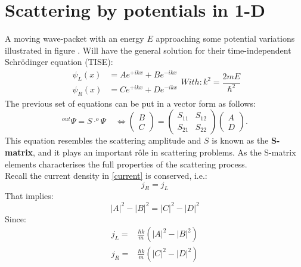 \section{Scattering by potentials in 1-D}
A moving wave-packet with an energy $E$ approaching some potential variations illustrated in figure . Will have the general solution for their time-independent Schr\"{o}dinger equation  (TISE):
\begin{subequations}
	\begin{align}
	\psi_L (x)&=Ae^{+ikx}+Be^{-ikx} \\
	\psi_R (x)&=Ce^{+ikx}+De^{-ikx} 
	\end{align}
	With:
	\begin{equation}
	k^2= \frac{2mE}{\hbar^2} \nonumber 
	\end{equation}
\end{subequations}
The previous set of equations can be put in a vector form as follows:
\begin{equation}
^{out}\Psi = S\cdot ^{o}\Psi \; \; \; \;  \Leftrightarrow \begin{pmatrix}B \\ C \end{pmatrix} = \begin{pmatrix} S_{11} & S_{12} \\ S_{21} & S_{22} \end{pmatrix}\begin{pmatrix} A \\ D \end{pmatrix}.
\end{equation}
This equation resembles the scattering amplitude and $S$ is known as the \textbf{S-matrix}, and it plays an important r\^{o}le in scattering problems. As the S-matrix elements characterises the full properties of the scattering process.\\ Recall the current density in \eqref{current} is conserved, i.e.:
\begin{equation}
j_R= j_L
\end{equation}
That implies:
\begin{equation}
|A|^2 -|B|^2 = |C|^2-| D|^2
\end{equation}
Since:
\begin{subequations}
	\begin{align}
	j_L =& \frac{\hbar k}{m}\left( |A|^2 -|B|^2\right)  \\
	j_R =& \frac{\hbar k}{m}\left( |C|^2 -|D|^2\right)
	\end{align}
\end{subequations}
